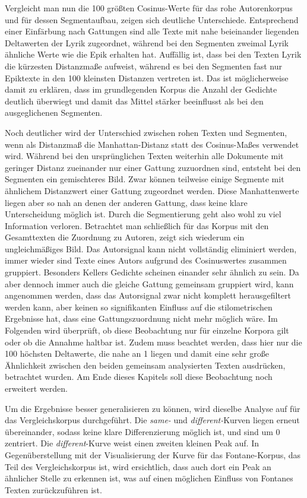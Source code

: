 \documentclass[a4paper,10p]{article}
\begin{document}
Vergleicht man nun die 100 größten Cosinus-Werte für das rohe Autorenkorpus und für dessen Segmentaufbau, zeigen sich deutliche Unterschiede. Entsprechend einer Einfärbung nach Gattungen sind alle Texte mit nahe beieinander liegenden Deltawerten der Lyrik zugeordnet, während bei den Segmenten zweimal Lyrik ähnliche Werte wie die Epik erhalten hat. Auffällig ist, dass bei den Texten Lyrik die kürzesten Distanzmaße aufweist, während es bei den Segmenten fast nur Epiktexte in den 100 kleinsten Distanzen vertreten ist. Das ist möglicherweise damit zu erklären, dass im grundlegenden Korpus die Anzahl der Gedichte deutlich überwiegt und damit das Mittel stärker beeinflusst als bei den ausgeglichenen Segmenten. \par 

Noch deutlicher wird der Unterschied zwischen rohen Texten und Segmenten, wenn als Distanzmaß die Manhattan-Distanz statt des Cosinus-Maßes verwendet wird. Während bei den ursprünglichen Texten weiterhin alle Dokumente mit geringer Distanz zueinander nur einer Gattung zuzuordnen sind, entsteht bei den Segmenten ein gemischteres Bild. Zwar können teilweise einige Segmente mit ähnlichem Distanzwert einer Gattung zugeordnet werden. Diese Manhattenwerte liegen aber so nah an denen der anderen Gattung, dass keine klare Unterscheidung möglich ist. Durch die Segmentierung geht also wohl zu viel Information verloren. Betrachtet man schließlich für das Korpus mit den Gesamttexten die Zuordnung zu Autoren, zeigt sich wiederum ein ungleichmäßiges Bild. Das Autorsignal kann nicht vollständig eliminiert werden, immer wieder sind Texte eines Autors aufgrund des Cosinuswertes zusammen gruppiert. Besonders Kellers Gedichte scheinen einander sehr ähnlich zu sein. Da aber dennoch immer auch die gleiche Gattung gemeinsam gruppiert wird, kann angenommen werden, dass das Autorsignal zwar nicht komplett herausgefiltert werden kann, aber keinen so signifikanten Einfluss auf die stilometrischen Ergebnisse hat, dass eine Gattungszuordnung nicht mehr möglich wäre. Im Folgenden wird überprüft, ob diese Beobachtung nur für einzelne Korpora gilt oder ob die Annahme haltbar ist. Zudem muss beachtet werden, dass hier nur die 100 höchsten Deltawerte, die nahe an 1 liegen und damit eine sehr große Ähnlichkeit zwischen den beiden gemeinsam analysierten Texten ausdrücken, betrachtet wurden. Am Ende dieses Kapitels soll diese Beobachtung noch erweitert werden. \par 

Um die Ergebnisse besser generalisieren zu können, wird dieselbe Analyse auf für das Vergleichskorpus durchgeführt. Die \textit{same-} und  \textit{different-}Kurven liegen erneut übereinander, sodass keine klare Differenzierung möglich ist, und sind um 0 zentriert. Die \textit{different}-Kurve weist einen zweiten kleinen Peak auf. In Gegenüberstellung mit der Visualisierung der Kurve für das Fontane-Korpus, das Teil des Vergleichskorpus ist, wird ersichtlich, dass auch dort ein Peak an ähnlicher Stelle zu erkennen ist, was auf einen möglichen Einfluss von Fontanes Texten zurückzuführen ist. \par 
\end{document}
